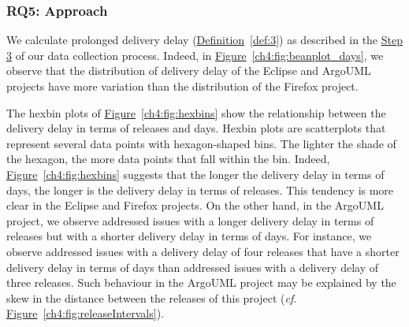 \subsubsection*{RQ5: Approach} We calculate prolonged delivery delay
(\hyperref[def:3]{Definition}~\ref{def:3}) as
described in the \hyperref[settings:step3]{Step 3} of our data collection
process. Indeed, in
\hyperref[ch4:fig:beanplot_days]{Figure}~\ref{ch4:fig:beanplot_days}, we observe that
the distribution of delivery delay of the Eclipse and ArgoUML projects have more variation than
the distribution of the Firefox project.

The hexbin plots of \hyperref[ch4:fig:hexbins]{Figure}~\ref{ch4:fig:hexbins} show the
relationship between the delivery delay in terms of releases and days. Hexbin
plots are scatterplots that represent several data points with hexagon-shaped
bins. The lighter the shade of the hexagon, the more data points that fall
within the bin. Indeed, \hyperref[ch4:fig:hexbins]{Figure}~\ref{ch4:fig:hexbins}
suggests that the longer the delivery delay in terms of days, the longer is
the delivery delay in terms of releases. This tendency is more clear in the
Eclipse and Firefox projects. On the other hand, in the ArgoUML project, we
observe addressed issues with a longer delivery delay in terms of releases but
with a shorter delivery delay in terms of days. For instance, we observe addressed
issues with a delivery delay of four releases that have a shorter delivery
delay in terms of days than addressed issues with a delivery delay of three
releases.  Such behaviour in the ArgoUML project may be explained by the skew in
the distance between the releases of this project ({\em cf.}
\hyperref[ch4:fig:releaseIntervals]{Figure}~\ref{ch4:fig:releaseIntervals}).

